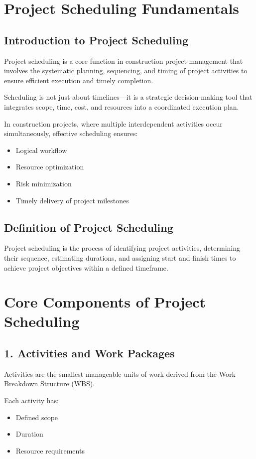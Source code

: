 \documentclass[12pt,a4paper]{article}
\begin{document}
\section*{Project Scheduling Fundamentals}

\subsection*{Introduction to Project Scheduling}
Project scheduling is a core function in construction project management that involves the systematic planning, sequencing, and timing of project activities to ensure efficient execution and timely completion.

Scheduling is not just about timelines—it is a strategic decision-making tool that integrates scope, time, cost, and resources into a coordinated execution plan.

In construction projects, where multiple interdependent activities occur simultaneously, effective scheduling ensures:
\begin{itemize}
    \item Logical workflow
    \item Resource optimization
    \item Risk minimization
    \item Timely delivery of project milestones
\end{itemize}

\subsection*{Definition of Project Scheduling}
Project scheduling is the process of identifying project activities, determining their sequence, estimating durations, and assigning start and finish times to achieve project objectives within a defined timeframe.

\section*{Core Components of Project Scheduling}

\subsection*{1. Activities and Work Packages}
Activities are the smallest manageable units of work derived from the Work Breakdown Structure (WBS).

Each activity has:
\begin{itemize}
    \item Defined scope
    \item Duration
    \item Resource requirements
\end{itemize}
\end{document}

